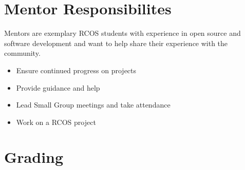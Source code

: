 \documentclass[12pt]{article}
\begin{document}

    \section{Mentor Responsibilites}

    Mentors are exemplary RCOS students with experience in open source and software development and want to help share their experience with the community.

    \begin{itemize}
        \item Ensure continued progress on projects
        \item Provide guidance and help
        \item Lead Small Group meetings and take attendance
        \item Work on a RCOS project
    \end{itemize}

    \section{Grading}

\end{document}

